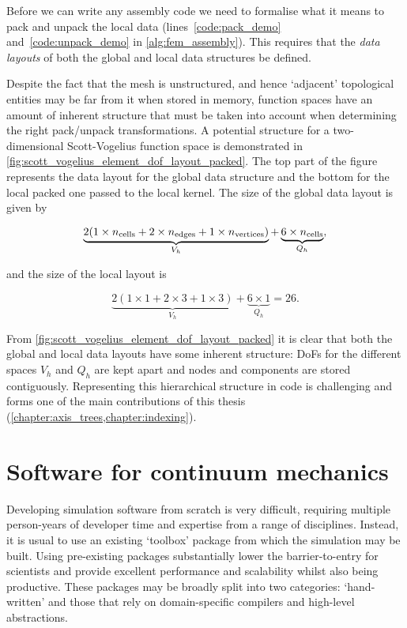 \documentclass[thesis]{subfiles}
\begin{document}
Before we can write any assembly code we need to formalise what it means to pack and unpack the local data (lines~\ref{code:pack_demo} and~\ref{code:unpack_demo} in \cref{alg:fem_assembly}).
This requires that the \textit{data layouts} of both the global and local data structures be defined.

Despite the fact that the mesh is unstructured, and hence `adjacent' topological entities may be far from it when stored in memory, function spaces have an amount of inherent structure that must be taken into account when determining the right pack/unpack transformations.
A potential structure for a two-dimensional Scott-Vogelius function space is demonstrated in \cref{fig:scott_vogelius_element_dof_layout_packed}.
The top part of the figure represents the data layout for the global data structure and the bottom for the local packed one passed to the local kernel.
The size of the global data layout is given by

\begin{equation*}
  \underbrace{2 ( 1 \times n_\textnormal{cells} + 2 \times n_\textnormal{edges} + 1 \times n_\textnormal{vertices} )}_{V_h} + \underbrace{6 \times n_\textnormal{cells}}_{Q_h},
\end{equation*}

\noindent
and the size of the local layout is

\begin{equation*}
  \underbrace{2 ( 1 \times 1 + 2 \times 3 + 1 \times 3 )}_{V_h} + \underbrace{6 \times 1}_{Q_h} = 26.
\end{equation*}

From \cref{fig:scott_vogelius_element_dof_layout_packed} it is clear that both the global and local data layouts have some inherent structure: DoFs for the different spaces $V_h$ and $Q_h$ are kept apart and nodes and components are stored contiguously.
Representing this hierarchical structure in code is challenging and forms one of the main contributions of this thesis (\cref{chapter:axis_trees,chapter:indexing}).

\section{Software for continuum mechanics}
\label{sec:introduction_software}


Developing simulation software from scratch is very difficult, requiring multiple person-years of developer time and expertise from a range of disciplines.
Instead, it is usual to use an existing `toolbox' package from which the simulation may be built.
Using pre-existing packages substantially lower the barrier-to-entry for scientists and provide excellent performance and scalability whilst also being productive.
These packages may be broadly split into two categories: `hand-written' and those that rely on domain-specific compilers and high-level abstractions.
\end{document}
